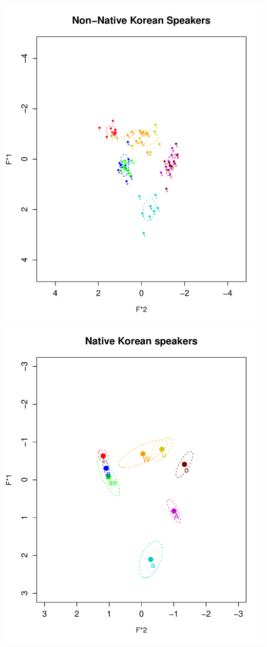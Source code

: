 \documentclass[man, fleqn, noextraspace]{apa6}
\begin{document}
\includegraphics{Group_5_Final_paper_files/figure-latex/SECTION2-3.pdf}
\includegraphics{Group_5_Final_paper_files/figure-latex/SECTION2-4.pdf}
\end{document}
